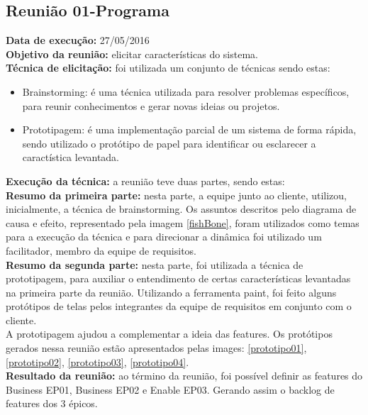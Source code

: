 \subsection{Reunião 01-Programa}
    \indent \textbf{Data de execução:} 27/05/2016\\
    \indent \textbf{Objetivo da reunião:} elicitar características do sistema.\\
    \indent \textbf{Técnica de elicitação:} foi utilizada um conjunto de técnicas sendo estas:
    \begin{itemize}
        \item Brainstorming: é uma técnica utilizada para resolver problemas específicos, para reunir conhecimentos e gerar novas ideias ou projetos.
        \item Prototipagem: é uma implementação parcial de um sistema de forma rápida, sendo utilizado o protótipo de papel para identificar ou esclarecer a caractística levantada.
    \end{itemize}
    \indent \indent \textbf{Execução da técnica:} a reunião teve duas partes, sendo estas:\\
    \indent \textbf{Resumo da primeira parte:} nesta parte, a equipe junto ao cliente, utilizou, inicialmente, a técnica de brainstorming. Os assuntos descritos pelo diagrama de causa e efeito, representado pela imagem \ref{fishBone}, foram utilizados como temas para a execução da técnica e para direcionar a dinâmica foi utilizado um facilitador, membro da equipe de requisitos.\\
    \indent \textbf{Resumo da segunda parte:} nesta parte, foi utilizada a técnica de prototipagem, para auxiliar o entendimento de certas características levantadas na primeira parte da reunião. Utilizando a ferramenta paint, foi feito alguns protótipos de telas pelos integrantes da equipe de requisitos em conjunto com o cliente.\\
    \indent A prototipagem ajudou a complementar a ideia das features. Os protótipos gerados nessa reunião estão apresentados pelas images:  \ref{prototipo01}, \ref{prototipo02}, \ref{prototipo03}, \ref{prototipo04}.\\
    \indent \textbf{Resultado da reunião:} ao término da reunião, foi possível definir as features do Business EP01, Business EP02 e Enable EP03. Gerando assim o backlog de features dos 3 épicos.\\

